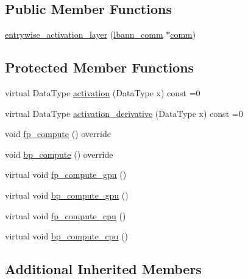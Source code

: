 \subsection*{Public Member Functions}
\begin{DoxyCompactItemize}
\item 
\hyperlink{classlbann_1_1entrywise__activation__layer_aada1d9200612dcd13259799ef327c557}{entrywise\+\_\+activation\+\_\+layer} (\hyperlink{classlbann_1_1lbann__comm}{lbann\+\_\+comm} $\ast$\hyperlink{file__io_8cpp_ab048c6f9fcbcfaa57ce68b00263dbebe}{comm})
\end{DoxyCompactItemize}
\subsection*{Protected Member Functions}
\begin{DoxyCompactItemize}
\item 
virtual Data\+Type \hyperlink{classlbann_1_1entrywise__activation__layer_a69269401530a2112b66660383464bab9}{activation} (Data\+Type x) const =0
\item 
virtual Data\+Type \hyperlink{classlbann_1_1entrywise__activation__layer_a7676a4c5060452a38264993554e79f8e}{activation\+\_\+derivative} (Data\+Type x) const =0
\item 
void \hyperlink{classlbann_1_1entrywise__activation__layer_a2ec05802115c5f029fa106c88ada89db}{fp\+\_\+compute} () override
\item 
void \hyperlink{classlbann_1_1entrywise__activation__layer_af632a590e26f335205994f1d715ae1a4}{bp\+\_\+compute} () override
\item 
virtual void \hyperlink{classlbann_1_1entrywise__activation__layer_aeb270dda0c2ec95dd34c35e1e8300f11}{fp\+\_\+compute\+\_\+gpu} ()
\item 
virtual void \hyperlink{classlbann_1_1entrywise__activation__layer_a569674cb4c0f50ea76acc0733fc53ba9}{bp\+\_\+compute\+\_\+gpu} ()
\item 
virtual void \hyperlink{classlbann_1_1entrywise__activation__layer_a8d4b0376b9783414c1cb7812351122ce}{fp\+\_\+compute\+\_\+cpu} ()
\item 
virtual void \hyperlink{classlbann_1_1entrywise__activation__layer_a38c2c090f26fb8ca269bef45989564a5}{bp\+\_\+compute\+\_\+cpu} ()
\end{DoxyCompactItemize}
\subsection*{Additional Inherited Members}


